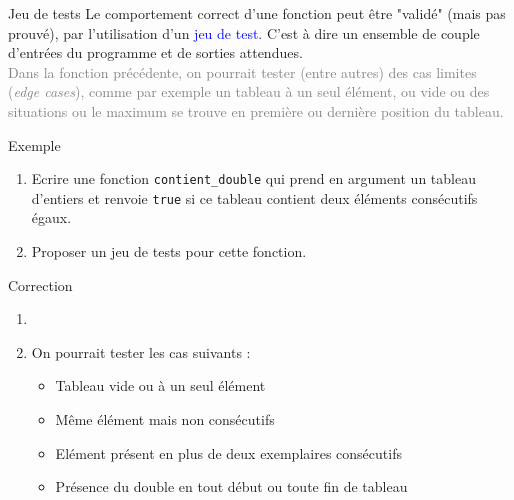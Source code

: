\documentclass[10pt]{beamer}
\begin{document}
\begin{frame}{\Ctitle}{\stitle}
	\begin{block}{Jeu de tests}
		\onslide<1->Le comportement correct d'une fonction peut être "validé" (mais pas prouvé), par l'utilisation d'un \textcolor{blue}{jeu de test}. C'est à dire un ensemble de couple d'entrées du programme et de sorties attendues. \\
		\onslide<2->\textcolor{gray}{Dans la fonction précédente, on pourrait tester (entre autres) des cas limites (\textit{edge cases}), comme par exemple un tableau à un seul élément, ou vide ou des situations ou le maximum se trouve en première ou dernière position du tableau.}
	\end{block}
	\begin{exampleblock}{Exemple}
		\begin{enumerate}
		\item<3-> Ecrire une fonction {\tt contient\_double} qui prend en argument un tableau d'entiers et renvoie {\tt true} si ce tableau contient deux éléments consécutifs égaux.
		\item<4-> Proposer un jeu de tests pour cette fonction.
		\end{enumerate}
	\end{exampleblock}
\end{frame}


\begin{frame}{\Ctitle}{\stitle}
	\begin{exampleblock}{Correction}
		\begin{enumerate}
		\item<1-> \ \\ 
		\item<2-> On pourrait tester les cas suivants :
		\begin{itemize}
			\item<3-> Tableau vide ou à un seul élément
			\item<4-> Même élément mais non consécutifs
			\item<5-> Elément présent en plus de deux exemplaires consécutifs
			\item<6-> Présence du double en tout début ou toute fin de tableau
		\end{itemize}
		\end{enumerate}
	\end{exampleblock}
\end{frame}
\end{document}
